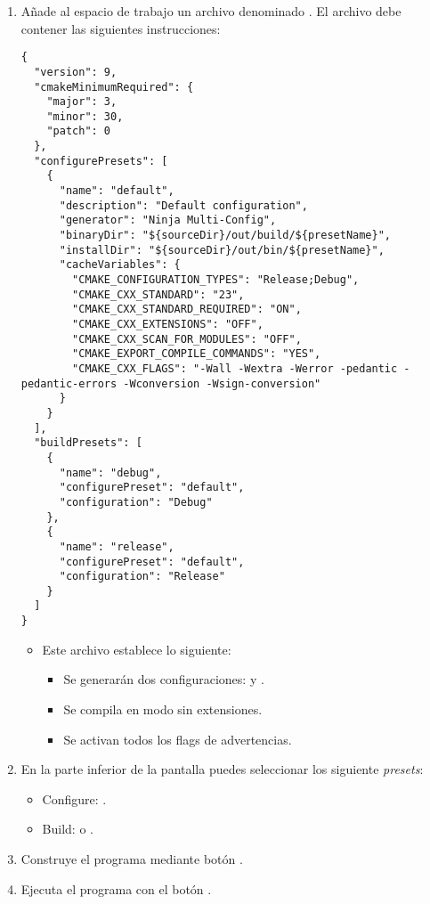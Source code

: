 \begin{enumerate}
\item
Añade al espacio de trabajo un archivo denominado . El
archivo debe contener las siguientes instrucciones:

\begin{lstlisting}
{
  "version": 9,
  "cmakeMinimumRequired": {
    "major": 3,
    "minor": 30,
    "patch": 0
  },
  "configurePresets": [
    {
      "name": "default",
      "description": "Default configuration",
      "generator": "Ninja Multi-Config",
      "binaryDir": "${sourceDir}/out/build/${presetName}",
      "installDir": "${sourceDir}/out/bin/${presetName}",
      "cacheVariables": {
        "CMAKE_CONFIGURATION_TYPES": "Release;Debug",
        "CMAKE_CXX_STANDARD": "23",
        "CMAKE_CXX_STANDARD_REQUIRED": "ON",
        "CMAKE_CXX_EXTENSIONS": "OFF",
        "CMAKE_CXX_SCAN_FOR_MODULES": "OFF",
        "CMAKE_EXPORT_COMPILE_COMMANDS": "YES",
        "CMAKE_CXX_FLAGS": "-Wall -Wextra -Werror -pedantic -pedantic-errors -Wconversion -Wsign-conversion"
      }
    }
  ],
  "buildPresets": [
    {
      "name": "debug",
      "configurePreset": "default",
      "configuration": "Debug"
    },
    {
      "name": "release",
      "configurePreset": "default",
      "configuration": "Release"
    }
  ]
}
\end{lstlisting}

  \begin{itemize}
    \item Este archivo establece lo siguiente:
      \begin{itemize}
        \item Se generarán dos configuraciones: 
               y .
        \item Se compila en modo  sin extensiones.
        \item Se activan todos los flags de advertencias.
      \end{itemize}
  \end{itemize}

\item En la parte inferior de la pantalla puedes seleccionar los siguiente
      \emph{presets}:
  \begin{itemize}
    \item Configure: .
    \item Build:  o .
  \end{itemize}

\item
Construye el programa mediante botón .

\item
Ejecuta el programa con el botón . 

\end{enumerate}

